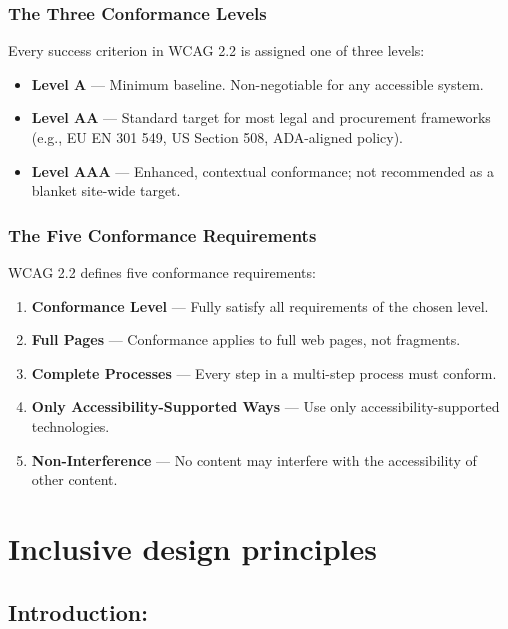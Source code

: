 \documentclass[11pt,a4paper]{article}
\begin{document}
		\subsubsection{The Three Conformance Levels}
		Every success criterion in WCAG 2.2 is assigned one of three levels:

		\begin{itemize}
		  \item \textbf{Level A} --- Minimum baseline. Non-negotiable for any
     		   accessible system.
		  \item \textbf{Level AA} --- Standard target for most legal and procurement
   		     frameworks (e.g., EU EN 301 549, US Section 508, ADA-aligned policy).
		  \item \textbf{Level AAA} --- Enhanced, contextual conformance; not
     		   recommended as a blanket site-wide target.
		\end{itemize}


		\subsubsection{The Five Conformance Requirements}
		WCAG 2.2 defines five conformance requirements:
	
		\begin{enumerate}
 		 \item \textbf{Conformance Level} --- Fully satisfy all requirements of the
    		    chosen level.
		  \item \textbf{Full Pages} --- Conformance applies to full web pages, not
    		    fragments.
		  \item \textbf{Complete Processes} --- Every step in a multi-step process must
  		      conform.
		  \item \textbf{Only Accessibility-Supported Ways} --- Use only
    		    accessibility-supported technologies.
		  \item \textbf{Non-Interference} --- No content may interfere with the
        accessibility of other content.
		\end{enumerate}

\newpage

\section{Inclusive design principles}

\subsection{Introduction:}
	
\end{document}
